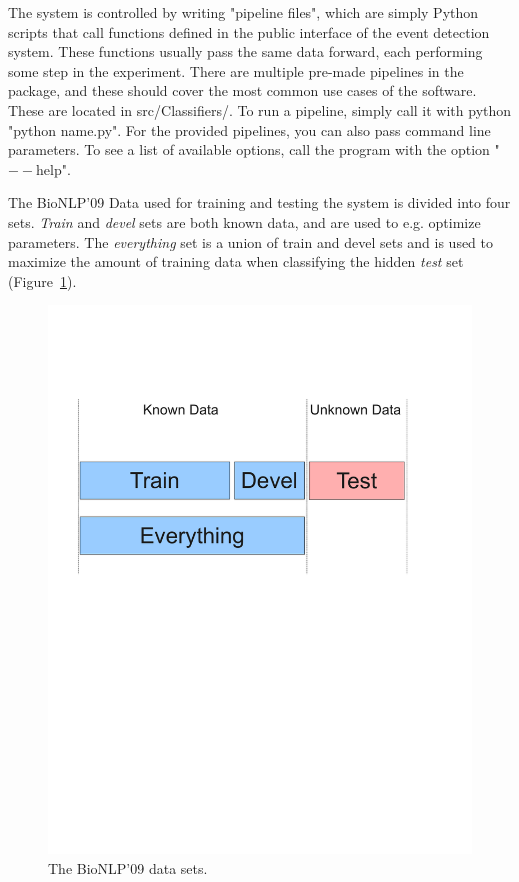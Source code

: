 \documentclass[a4paper,12pt]{article}
\begin{document}
The system is controlled by writing "pipeline files", which are simply Python
scripts that call functions defined in the public interface of the event
detection system. These functions usually pass the same data forward, each
performing some step in the experiment. There are multiple pre-made pipelines in
the package, and these should cover the most common use cases of the software.
These are located in src/Classifiers/. To run a pipeline, simply call it with
python "python name.py". For the provided pipelines, you can also pass command
line parameters. To see a list of available options, call the program with the
option "$--$help".

The BioNLP'09 Data used for training and testing the system is divided into
four sets. \emph{Train} and \emph{devel} sets are both known data, and are used
to e.g. optimize parameters. The \emph{everything} set is a union of train and
devel sets and is used to maximize the amount of training data when classifying
the hidden \emph{test} set (Figure~\ref{fig-sets}).

\begin{figure}[h]
\begin{center}
\includegraphics[trim = 0mm 150mm 0mm 50mm,
clip,scale=0.5]{Figures/DataSets.pdf}
\end{center}
\caption{The BioNLP'09 data sets.}
\label{fig-sets}
\end{figure}
\end{document}
